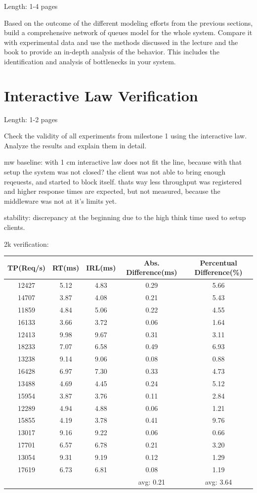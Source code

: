 \documentclass[11pt]{article}
\begin{document}
Length: 1-4 pages

Based on the outcome of the different modeling efforts from the previous sections, build a comprehensive network of queues model for the whole system. Compare it with experimental data and use the methods discussed in the lecture and the book to provide an in-depth analysis of the behavior. This includes the identification and analysis of bottlenecks in your system.

\section{Interactive Law Verification}\label{sec:interactive-law}

Length: 1-2 pages

Check the validity of all experiments from milestone 1 using the interactive law. Analyze the results and explain them in detail.

mw baseline: with 1 cm interactive law does not fit the line, because with that setup the system was not closed? the client was not able to bring enough reqeuests, and started to block itself. thats way less throughput was registered and higher response times are expected, but not measured, because the middleware was not at it's limits yet.

stability: discrepancy at the beginning due to the high think time used to setup clients.

2k verification:

\begin{tabular}{c|c|c||c|c}
	TP(Req/s) & RT(ms) & IRL(ms) & Abs. Difference(ms) & Percentual Difference(\%) \\
	\hline
	12427 & 5.12 & 4.83 & 0.29 & 5.66 \\
	14707 & 3.87 & 4.08 & 0.21 & 5.43 \\
	11859 & 4.84 & 5.06 & 0.22 & 4.55 \\
	16133 & 3.66 & 3.72 & 0.06 & 1.64 \\
	12413 & 9.98 & 9.67 & 0.31 & 3.11 \\
	18233 & 7.07 & 6.58 & 0.49 & 6.93 \\
	13238 & 9.14 & 9.06 & 0.08 & 0.88 \\
	16428 & 6.97 & 7.30 & 0.33 & 4.73 \\
	13488 & 4.69 & 4.45 & 0.24 & 5.12 \\
	15954 & 3.87 & 3.76 & 0.11 & 2.84 \\
	12289 & 4.94 & 4.88 & 0.06 & 1.21 \\
	15855 & 4.19 & 3.78 & 0.41 & 9.76 \\
	13017 & 9.16 & 9.22 & 0.06 & 0.66 \\
	17701 & 6.57 & 6.78 & 0.21 & 3.20 \\
	13054 & 9.31 & 9.19 & 0.12 & 1.29 \\
	17619 & 6.73 & 6.81 & 0.08 & 1.19 \\
	\hline  
	&&& avg: 0.21 & avg: 3.64 \\
	\hline  
\end{tabular}
\end{document}

